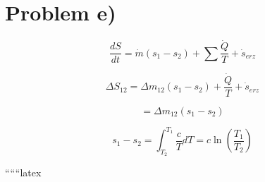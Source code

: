 \section*{Problem e)}

\begin{equation*}
\frac{dS}{dt} = \dot{m}(s_1 - s_2) + \sum \frac{\dot{Q}}{T} + \dot{s}_{erz}
\end{equation*}

\begin{equation*}
\Delta S_{12} = \Delta m_{12} (s_1 - s_2) + \frac{\dot{Q}}{T} + \dot{s}_{erz}
\end{equation*}

\begin{equation*}
= \Delta m_{12} (s_1 - s_2)
\end{equation*}

\begin{equation*}
s_1 - s_2 = \int_{T_2}^{T_1} \frac{c}{T} dT = c \ln \left( \frac{T_1}{T_2} \right)
\end{equation*}

``````latex